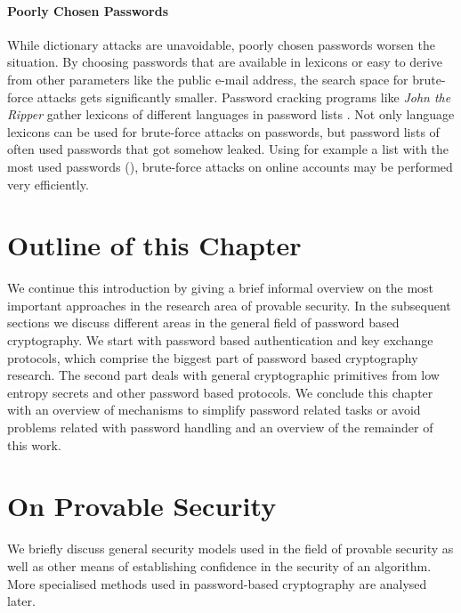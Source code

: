 \paragraph{Poorly Chosen Passwords}
While dictionary attacks are unavoidable, poorly chosen passwords worsen the situation.
By choosing passwords that are available in lexicons or easy to derive from other parameters like the public e-mail address, the search space for brute-force attacks gets significantly smaller.
Password cracking programs like \emph{John the Ripper} \cite{JohnTheRipper} gather lexicons of different languages in password lists \cite{JohnTheRipperWordlist}.
Not only language lexicons can be used for brute-force attacks on passwords, but password lists of often used passwords that got somehow leaked.
Using for example a list with the most used passwords (\eg \cite{XatoPwds}), brute-force attacks on online accounts may be performed very efficiently.

\section{Outline of this Chapter}

We continue this introduction by giving a brief informal overview on the most important approaches in the research area of provable security.
In the subsequent sections we discuss different areas in the general field of password based cryptography.
We start with password based authentication and key exchange protocols, which comprise the biggest part of password based cryptography research.
The second part deals with general cryptographic primitives from low entropy secrets and other password based protocols.
We conclude this chapter with an overview of mechanisms to simplify password related tasks or avoid problems related with password handling and an overview of the remainder of this work.


\section{On Provable Security}
We briefly discuss general security models used in the field of provable security as well as other means of establishing confidence in the security of an algorithm.
More specialised methods used in password-based cryptography are analysed later.

